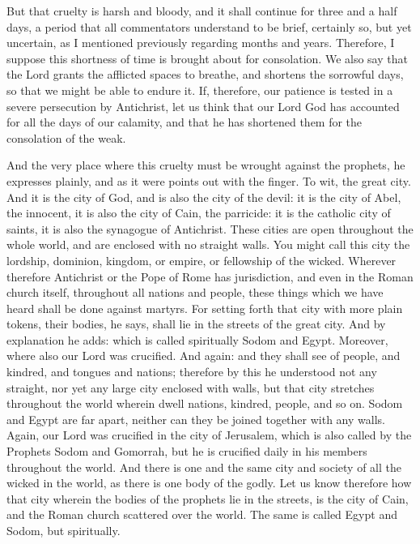 But that cruelty is harsh and bloody, and it shall continue for three and a half days, a period that all commentators understand to be brief, certainly so, but yet uncertain, as I mentioned previously regarding months and years. Therefore, I suppose this shortness of time is brought about for consolation. We also say that the Lord grants the afflicted spaces to breathe, and shortens the sorrowful days, so that we might be able to endure it. If, therefore, our patience is tested in a severe persecution by Antichrist, let us think that our Lord God has accounted for all the days of our calamity, and that he has shortened them for the consolation of the weak.

And the very place where this cruelty must be wrought against the prophets, he expresses plainly, and as it were points out with the finger. To wit, the great city. And it is the city of God, and is also the city of the devil: it is the city of Abel, the innocent, it is also the city of Cain, the parricide: it is the catholic city of saints, it is also the synagogue of Antichrist. These cities are open throughout the whole world, and are enclosed with no straight walls. You might call this city the lordship, dominion, kingdom, or empire, or fellowship of the wicked. Wherever therefore Antichrist or the Pope of Rome has jurisdiction, and even in the Roman church itself, throughout all nations and people, these things which we have heard shall be done against martyrs. For setting forth that city with more plain tokens, their bodies, he says, shall lie in the streets of the great city. And by explanation he adds: which is called spiritually Sodom and Egypt. Moreover, where also our Lord was crucified. And again: and they shall see of people, and kindred, and tongues and nations; therefore by this he understood not any straight, nor yet any large city enclosed with walls, but that city stretches throughout the world wherein dwell nations, kindred, people, and so on. Sodom and Egypt are far apart, neither can they be joined together with any walls. Again, our Lord was crucified in the city of Jerusalem, which is also called by the Prophets Sodom and Gomorrah, but he is crucified daily in his members throughout the world. And there is one and the same city and society of all the wicked in the world, as there is one body of the godly. Let us know therefore how that city wherein the bodies of the prophets lie in the streets, is the city of Cain, and the Roman church scattered over the world. The same is called Egypt and Sodom, but spiritually.


